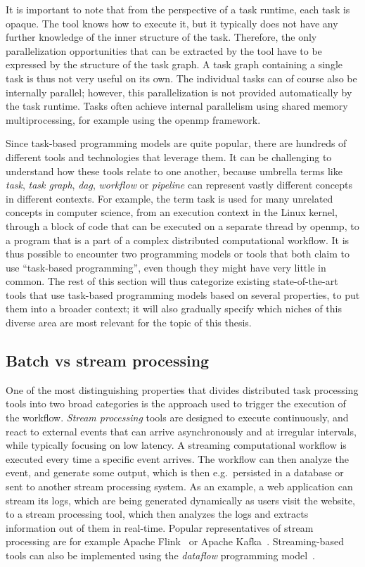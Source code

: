 It is important to note that from the perspective of a task runtime, each task is opaque. The tool
knows how to execute it, but it typically does not have any further knowledge of the inner
structure of the task. Therefore, the only parallelization opportunities that can be extracted by
the tool have to be expressed by the structure of the task graph. A task graph containing a single
task is thus not very useful on its own. The individual tasks can of course also be internally
parallel; however, this parallelization is not provided automatically by the task runtime. Tasks
often achieve internal parallelism using shared memory multiprocessing, for example using the
\gls{openmp} framework.

Since task-based programming models are quite popular, there are hundreds of different tools and
technologies that leverage them. It can be challenging to understand how these tools relate to
one another, because umbrella terms like \emph{task}, \emph{task graph},
\emph{\gls{dag}}, \emph{workflow} or \emph{pipeline} can represent vastly
different concepts in different contexts. For example, the term task is used for many unrelated
concepts in computer science, from an execution context in the Linux kernel, through a block of
code that can be executed on a separate thread by \gls{openmp}, to a program that is a
part of a complex distributed computational workflow. It is thus possible to encounter two
programming models or tools that both claim to use ``task-based programming'', even though they
might have very little in common. The rest of this section will thus categorize existing
state-of-the-art tools that use task-based programming models based on several properties, to put
them into a broader context; it will also gradually specify which niches of this diverse area
are most relevant for the topic of this thesis.

\subsection{Batch vs stream processing}
One of the most distinguishing properties that divides distributed task processing tools into two
broad categories is the approach used to trigger the execution of the workflow.
\emph{Stream processing} tools are designed to execute continuously, and react to external events
that can arrive asynchronously and at irregular intervals, while typically focusing on low latency.
A streaming computational workflow is executed every time a specific event arrives. The workflow
can then analyze the event, and generate some output, which is then e.g.\ persisted in a
database or sent to another stream processing system. As an example, a web application can stream
its logs, which are being generated dynamically as users visit the website, to a stream processing
tool, which then analyzes the logs and extracts information out of them in real-time. Popular
representatives of stream processing are for example Apache Flink~\cite{flink} or Apache
Kafka~\cite{kafka}. Streaming-based tools can also be implemented using the
\emph{dataflow} programming model~\cite{dataflow,timely_dataflow}.

